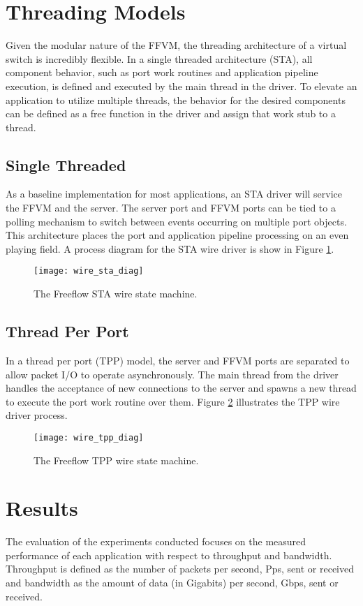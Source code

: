 \section{Threading Models}
\label{expr:models}
Given the modular nature of the FFVM, the threading architecture of a virtual
switch is incredibly flexible. In a single threaded architecture (STA), all
component behavior, such as port work routines and application pipeline
execution, is defined and executed by the main thread in the driver. To elevate
an application to utilize multiple threads, the behavior for the desired
components can be defined as a free function in the driver and assign that
work stub to a thread.

\subsection{Single Threaded}
\label{expr:models-single}
As a baseline implementation for most applications, an STA driver will service
the FFVM and the server. The server port and FFVM ports can be tied to a polling
mechanism to switch between events occurring on multiple port objects. This
architecture places the port and application pipeline processing on an even
playing field. A process diagram for the STA wire driver is show in Figure
\ref{wire_sta_diag}.

\begin{figure}[h!]
  \centering
  \texttt{[image: wire\_sta\_diag]}
  \caption{The Freeflow STA wire state machine.}
  \label{wire_sta_diag}
\end{figure}

\subsection{Thread Per Port}
\label{expr:models-port}
In a thread per port (TPP) model, the server and FFVM ports are separated to
allow packet I/O to operate asynchronously. The main thread from the driver
handles the acceptance of new connections to the server and spawns a new thread
to execute the port work routine over them. Figure \ref{wire_tpp_diag}
illustrates the TPP wire driver process.

\begin{figure}[h!]
  \centering
  \texttt{[image: wire\_tpp\_diag]}
  \caption{The Freeflow TPP wire state machine.}
  \label{wire_tpp_diag}
\end{figure}

\section{Results}
\label{expr:results}
The evaluation of the experiments conducted focuses on the measured performance
of each application with respect to throughput and bandwidth. Throughput is
defined as the number of packets per second, Pps, sent or received and
bandwidth as the amount of data (in Gigabits) per second, Gbps, sent or
received.

